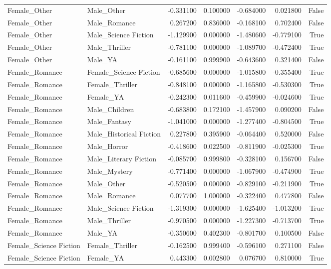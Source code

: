 \begin{tabular}{llrrrrr}
Female_Other & Male_Other & -0.331100 & 0.100000 & -0.684000 & 0.021800 & False \\
Female_Other & Male_Romance & 0.267200 & 0.836000 & -0.168100 & 0.702400 & False \\
Female_Other & Male_Science Fiction & -1.129900 & 0.000000 & -1.480600 & -0.779100 & True \\
Female_Other & Male_Thriller & -0.781100 & 0.000000 & -1.089700 & -0.472400 & True \\
Female_Other & Male_YA & -0.161100 & 0.999900 & -0.643600 & 0.321400 & False \\
Female_Romance & Female_Science Fiction & -0.685600 & 0.000000 & -1.015800 & -0.355400 & True \\
Female_Romance & Female_Thriller & -0.848100 & 0.000000 & -1.165800 & -0.530300 & True \\
Female_Romance & Female_YA & -0.242300 & 0.011600 & -0.459900 & -0.024600 & True \\
Female_Romance & Male_Children & -0.683800 & 0.172100 & -1.457900 & 0.090200 & False \\
Female_Romance & Male_Fantasy & -1.041000 & 0.000000 & -1.277400 & -0.804500 & True \\
Female_Romance & Male_Historical Fiction & 0.227800 & 0.395900 & -0.064400 & 0.520000 & False \\
Female_Romance & Male_Horror & -0.418600 & 0.022500 & -0.811900 & -0.025300 & True \\
Female_Romance & Male_Literary Fiction & -0.085700 & 0.999800 & -0.328100 & 0.156700 & False \\
Female_Romance & Male_Mystery & -0.771400 & 0.000000 & -1.067900 & -0.474900 & True \\
Female_Romance & Male_Other & -0.520500 & 0.000000 & -0.829100 & -0.211900 & True \\
Female_Romance & Male_Romance & 0.077700 & 1.000000 & -0.322400 & 0.477800 & False \\
Female_Romance & Male_Science Fiction & -1.319300 & 0.000000 & -1.625400 & -1.013200 & True \\
Female_Romance & Male_Thriller & -0.970500 & 0.000000 & -1.227300 & -0.713700 & True \\
Female_Romance & Male_YA & -0.350600 & 0.402300 & -0.801700 & 0.100500 & False \\
Female_Science Fiction & Female_Thriller & -0.162500 & 0.999400 & -0.596100 & 0.271100 & False \\
Female_Science Fiction & Female_YA & 0.443300 & 0.002800 & 0.076700 & 0.810000 & True \\

\end{tabular}
